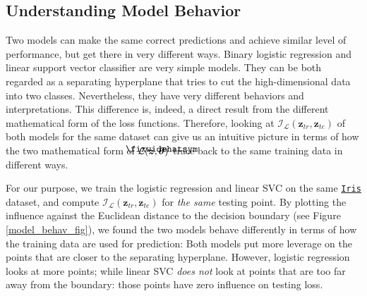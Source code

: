 \documentclass{article}
\newcommand\lowerwidehatsym{%
  \text{\smash{\raisebox{-1.3ex}{%
    $\fixwidehatsym$}}}}
\newcommand\fixwidehat[1]{%
  \mathchoice
    {\accentset{\displaystyle\lowerwidehatsym}{#1}}
    {\accentset{\textstyle\lowerwidehatsym}{#1}}
    {\accentset{\scriptstyle\lowerwidehatsym}{#1}}
    {\accentset{\scriptscriptstyle\lowerwidehatsym}{#1}}
}
\begin{document}
\subsection{Understanding Model Behavior}
Two models can make the same correct predictions and achieve similar level of performance, but get there in very different ways. Binary logistic regression and linear support vector classifier are very simple models. They can be both regarded as a separating hyperplane that tries to cut the high-dimensional data into two classes. Nevertheless, they have very different behaviors and interpretations. This difference is, indeed, a direct result from the different mathematical form of the loss functions. Therefore, looking at $\mathcal{I}_{\mathcal{L}}(\bm{z}_{tr}, \bm{z}_{te})$ of both models for the same dataset can give us an intuitive picture in terms of how the two mathematical form of $\mathcal{L}(\bm{z}, \fixwidehat{\bm{\theta}})$ trace back to the same training data in different ways.

For our purpose, we train the logistic regression and linear SVC on the same \href{https://archive.ics.uci.edu/ml/datasets/iris}{\texttt{Iris}} dataset, and compute $\mathcal{I}_{\mathcal{L}}(\bm{z}_{tr}, \bm{z}_{te})$ for \emph{the same} testing point. By plotting the influence against the Euclidean distance to the decision boundary (see Figure \ref{model_behav_fig}), we found the two models behave differently in terms of how the training data are used for prediction: Both models put more leverage on the points that are closer to the separating hyperplane. However, logistic regression looks at more points; while linear SVC \emph{does not} look at points that are too far away from the boundary: those points have zero influence on testing loss.
\end{document}
